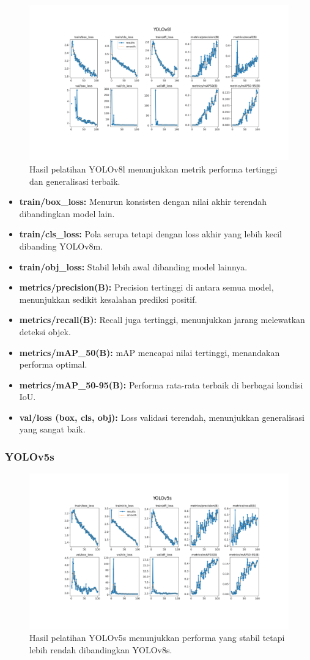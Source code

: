 \documentclass[12pt,a4paper]{article}
\begin{document}
\begin{figure}[H]
    \centering
    \includegraphics[width=0.6\linewidth]{assets/yolov8l_results.png}
    \caption{Hasil pelatihan YOLOv8l menunjukkan metrik performa tertinggi dan generalisasi terbaik.}
    \label{fig:yolov8l_results}
\end{figure}

\begin{itemize}
    \item \textbf{train/box\_loss:} Menurun konsisten dengan nilai akhir terendah dibandingkan model lain.
    \item \textbf{train/cls\_loss:} Pola serupa tetapi dengan loss akhir yang lebih kecil dibanding YOLOv8m.
    \item \textbf{train/obj\_loss:} Stabil lebih awal dibanding model lainnya.
    \item \textbf{metrics/precision(B):} Precision tertinggi di antara semua model, menunjukkan sedikit kesalahan prediksi positif.
    \item \textbf{metrics/recall(B):} Recall juga tertinggi, menunjukkan jarang melewatkan deteksi objek.
    \item \textbf{metrics/mAP\_50(B):} mAP mencapai nilai tertinggi, menandakan performa optimal.
    \item \textbf{metrics/mAP\_50-95(B):} Performa rata-rata terbaik di berbagai kondisi IoU.
    \item \textbf{val/loss (box, cls, obj):} Loss validasi terendah, menunjukkan generalisasi yang sangat baik.
\end{itemize}

\subsubsection{YOLOv5s}

\begin{figure}[H]
    \centering
    \includegraphics[width=0.6\linewidth]{assets/yolov5s_results.png}
    \caption{Hasil pelatihan YOLOv5s menunjukkan performa yang stabil tetapi lebih rendah dibandingkan YOLOv8s.}
    \label{fig:yolov5s_results}
\end{figure}
\end{document}
